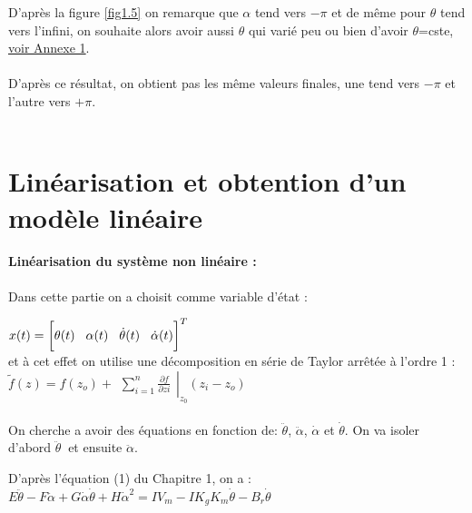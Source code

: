 \documentclass[12pt, a4paper, openany]{report}
\begin{document}
D’après la figure \ref{fig1.5} on remarque que $\alpha$ tend vers $-\pi$ et de même pour $\theta$
tend vers l'infini, on souhaite alors avoir aussi $\theta$ qui varié peu ou bien d'avoir $\theta$=cste,
 \hyperref[section1.1]{voir Annexe 1}\label{annexe1}.\\\\
 D'après ce résultat, on obtient pas les même valeurs finales, une tend vers $-\pi$ et l'autre vers $+\pi$.\\\\

\section{Linéarisation et obtention d'un modèle linéaire}
\paragraph{Linéarisation du système non linéaire :\\}
Dans cette partie on a choisit comme variable d'état :

 $x(t)=\bigg[\theta(t)\hspace{3mm}\alpha(t)\hspace{3mm} \dot{\theta}(t)\hspace{3mm} \dot{\alpha}(t)\bigg]^{T}$ \\  
   et à cet effet on utilise une décomposition en série de Taylor arrêtée à l'ordre 1 :\\
   
   $\tilde{f}(z)=f(z_{o})+\left.\begin{matrix}\sum_{i=1}^{n}\frac{\partial f }{\partial zi}\end{matrix}\right|_{z_0} (z_{i}-z_{o})$ \\\\ 
   
   On cherche a avoir des équations en fonction de:  $\ddot{\theta }$, $\ddot{\alpha}$, $\dot{\alpha}$ et $\dot{\theta}$. On va isoler d'abord $\ddot{\theta }\:$ et ensuite $\ddot{\alpha}$.

D'après l'équation (1) du Chapitre 1, on a : \\


    $E\ddot{\theta }-F\ddot{\alpha}+ G\dot{\alpha}\dot{\theta}+H\dot{\alpha}^2=IV_{m}-IK_{g}K_{m}\dot{\theta}-B_{r}\dot{\theta}$\\\\
\end{document}
